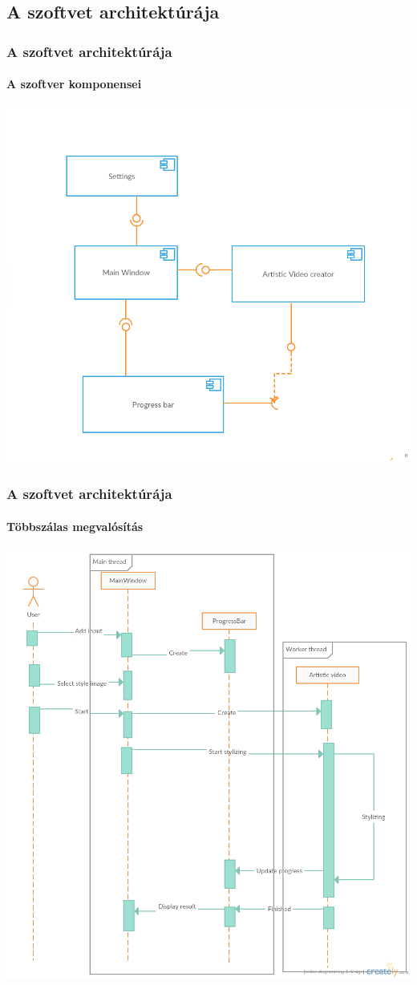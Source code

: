 \documentclass{beamer}
\begin{document}
	\subsection{A szoftvet architektúrája}
	
	\begin{frame}
		\frametitle{A szoftvet architektúrája}
		\framesubtitle{A szoftver komponensei}
		\begin{center}
			\includegraphics[scale=0.3]{component_diagram.png}
		\end{center}
	\end{frame}

	\begin{frame}
		\frametitle{A szoftvet architektúrája}
		\framesubtitle{Többszálas megvalósítás}
		\begin{center}
			\includegraphics[scale=0.2]{seq_diagram.png}
		\end{center}
	\end{frame}
\end{document}
